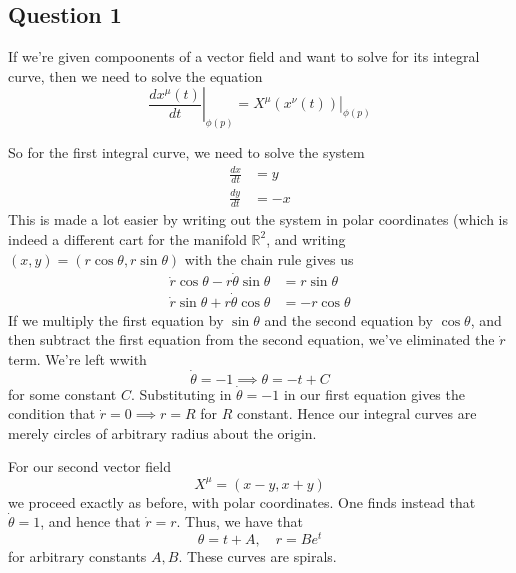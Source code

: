 \subsection{Question 1} 
If we're given compoonents of a vector field and want to solve for its integral curve, then we need to solve the equation
\[ 
\left. \frac{ d x^\mu(t) }{ dt} \right\vert_{\phi(p)} = \left. X^\mu( x^\nu(t) ) \right\vert_{ \phi( p)}
\] 

So for the first integral curve, we need to solve the system 
\begin{align*} 
\frac{dx}{dt}  &= y \\
\frac{dy}{dt}  &= -x 
\end{align*} 
This is made a lot easier by writing out the system in polar coordinates (which is indeed a different cart for the manifold $\mathbb{R}^2$, and writing $(x , y)  = ( r \cos \theta, r \sin \theta)$ with the chain rule gives us 
\begin{align*} 
\dot{r} \cos \theta  - r \dot{\theta} \sin \theta  &= r \sin \theta \\
\dot{r} \sin \theta  + r \dot{\theta} \cos \theta &=  - r \cos \theta 
\end{align*} 
If we multiply the first equation by $\sin \theta$ and the second equation by $\cos \theta$, and then subtract the first equation from the second equation, we've eliminated the $\dot{ r}$ term. We're left wwith 
\[ 
\dot{\theta} =  -1 \implies \theta  =  - t + C
\] 
for some constant $C$. Substituting in $\dot{\theta} = - 1$ in our first equation gives the condition that $\dot{r} = 0 \implies r = R$ for $R$ constant. Hence our integral curves are merely circles of arbitrary radius about the origin. 

For our second vector field 
\[ 
X^\mu  = ( x - y, x +y ) 
\] 
we proceed exactly as before, with polar coordinates. One finds instead that $\dot{\theta} = 1$, and hence that $\dot{r}  = r$. Thus, we have that 
\[
\theta = t + A, \quad r = Be^t 
\] 
for arbitrary constants $A, B$. These curves are spirals. 

\pagebreak
